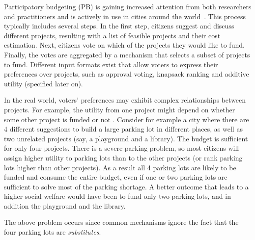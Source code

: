 \documentclass[runningheads]{llncs}
\begin{document}
Participatory budgeting (PB) is gaining increased attention from both researchers and practitioners  and is actively in use in  cities around the world~\cite{su2017porto}. 
This process typically includes several steps. In the first step,  citizens suggest and discuss  different projects, resulting with a   list of feasible projects and  their cost estimation. Next,  citizens vote on which of the projects they would like to  fund. Finally, the votes are aggregated by a mechanism that selects a subset of projects to fund.
Different  input formats exist that allow  voters to express their preferences over    projects, such as approval voting, knapsack ranking and additive utility (specified later on). %


In the real world, voters' preferences may exhibit complex relationships between projects. For example,  the utility from one project might depend on whether some other project is funded or not \cite{jain2020participatory, jain2021partition}.
Consider for example a city where there are 4 different suggestions to build a large parking lot in different places, as well as two unrelated projects (say, a playground and a library). The budget is sufficient for only four projects.
There is a severe parking problem, so most citizens will assign higher utility to parking lots than to the other projects (or rank parking lots higher than other projects). As a result all 4 parking lots are likely to be funded and consume the entire budget, even if one or two parking lots are sufficient to solve most of the parking shortage.
A better outcome that leads to a higher social welfare would have been to fund only two parking lots, and in addition the playground and the library. 

The above problem occurs since common mechanisms   ignore the fact that the four parking lots are \emph{substitutes}. 
\end{document}
